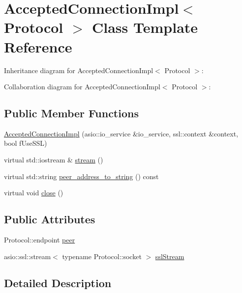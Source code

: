 \hypertarget{class_accepted_connection_impl}{}\section{Accepted\+Connection\+Impl$<$ Protocol $>$ Class Template Reference}
\label{class_accepted_connection_impl}


Inheritance diagram for Accepted\+Connection\+Impl$<$ Protocol $>$\+:


Collaboration diagram for Accepted\+Connection\+Impl$<$ Protocol $>$\+:
\subsection*{Public Member Functions}
\begin{DoxyCompactItemize}
\item 
\hyperlink{class_accepted_connection_impl_adaf674801c89a76de0bbb4154f2cf3b8}{Accepted\+Connection\+Impl} (asio\+::io\+\_\+service \&io\+\_\+service, ssl\+::context \&context, bool f\+Use\+S\+S\+L)
\item 
virtual std\+::iostream \& \hyperlink{class_accepted_connection_impl_ab15396a413e40f947b7d527a2afe37fa}{stream} ()
\item 
virtual std\+::string \hyperlink{class_accepted_connection_impl_a5fe6c34eeec9f5c829629ae3e0539a11}{peer\+\_\+address\+\_\+to\+\_\+string} () const 
\item 
virtual void \hyperlink{class_accepted_connection_impl_a1b114863c047cae57ce42564f9a29be1}{close} ()
\end{DoxyCompactItemize}
\subsection*{Public Attributes}
\begin{DoxyCompactItemize}
\item 
Protocol\+::endpoint \hyperlink{class_accepted_connection_impl_ade939b7d2778690cf78a9f6719f47c76}{peer}
\item 
asio\+::ssl\+::stream$<$ typename Protocol\+::socket $>$ \hyperlink{class_accepted_connection_impl_afcfc99c020d301985bc19b4075fc7e78}{ssl\+Stream}
\end{DoxyCompactItemize}


\subsection{Detailed Description}
